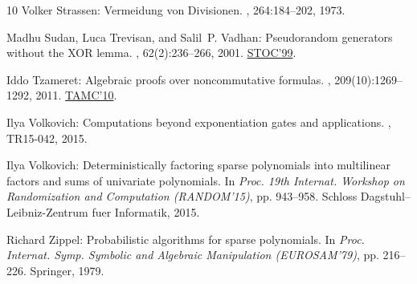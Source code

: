 \documentclass[11pt]{article}
\numberwithin{equation}{section}
\theoremstyle{definition}
\theoremstyle{plain}
\begin{document}
\begin{thebibliography}{10}
{\sc Volker Strassen}: Vermeidung von {D}ivisionen.
, 264:184--202, 1973.

{\sc Madhu Sudan, Luca Trevisan, and Salil~P. Vadhan}: Pseudorandom generators
  without the {XOR} lemma.
, 62(2):236--266, 2001.
\newblock \prelim \href{https://doi.org/10.1145/301250.301397}{STOC'99}.

{\sc Iddo Tzameret}: Algebraic proofs over noncommutative formulas.
, 209(10):1269--1292, 2011.
\newblock \prelim \href{https://doi.org/10.1007/978-3-642-13562-0\_7}{TAMC'10}.

{\sc Ilya Volkovich}: Computations beyond exponentiation gates and
  applications.
, TR15-042, 2015.

{\sc Ilya Volkovich}: Deterministically factoring sparse polynomials into
  multilinear factors and sums of univariate polynomials.
\newblock In {\em Proc. 19th Internat. Workshop on Randomization and
  Computation (RANDOM'15)}, pp. 943--958. Schloss Dagstuhl--Leibniz-Zentrum
  fuer Informatik, 2015.

{\sc Richard Zippel}: Probabilistic algorithms for sparse polynomials.
\newblock In {\em Proc. Internat. Symp. Symbolic and Algebraic Manipulation
  (EUROSAM'79)}, pp. 216--226. Springer, 1979.
\newblock [\epfmtdoi{10.1007/3-540-09519-5\_73}]

\end{thebibliography}
\end{document}
